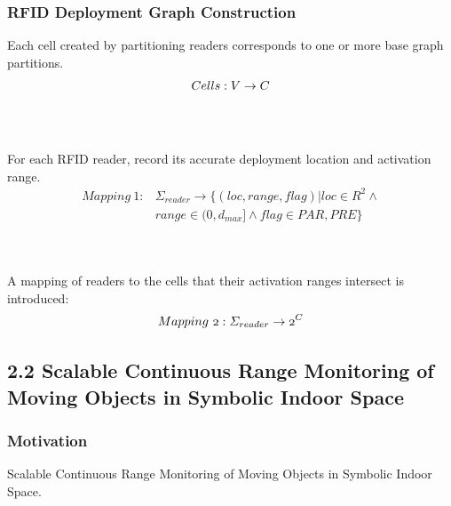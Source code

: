 \documentclass{beamer}
\begin{document}
\begin{frame}
\frametitle{RFID Deployment Graph Construction}

\small{Each cell created by partitioning readers corresponds to one or more base graph partitions.}
\pause
\begin{equation}
\mathnormal{Cells: V \rightarrow C}
\end{equation}
\\~\\
\pause

\small{For each RFID reader, record its accurate deployment location and activation range.}
\pause
\begin{equation}
\begin{aligned}
Mapping~1: &\Sigma_{reader} \rightarrow \{ (loc, range, flag) | loc \in R^2 \wedge \\
  &range \in (0,d_{max}] \wedge flag \in {PAR, PRE} \}
\end{aligned}
\end{equation}
\\~\\
\pause

\small{A mapping of readers to the cells that their activation ranges intersect is introduced:}
\pause
\begin{equation}
\mathnormal{
Mapping~2: \Sigma_{reader} \rightarrow 2^C
}
\end{equation}

\end{frame}



\subsection{2.2 Scalable Continuous Range Monitoring of Moving Objects in Symbolic Indoor Space} %

\begin{frame}
\frametitle{Motivation}
Scalable Continuous Range Monitoring of Moving Objects in Symbolic Indoor Space.~\cite{DBLP:conf/cikm/YangLJ09}\\~\\


\end{frame}
\end{document}
